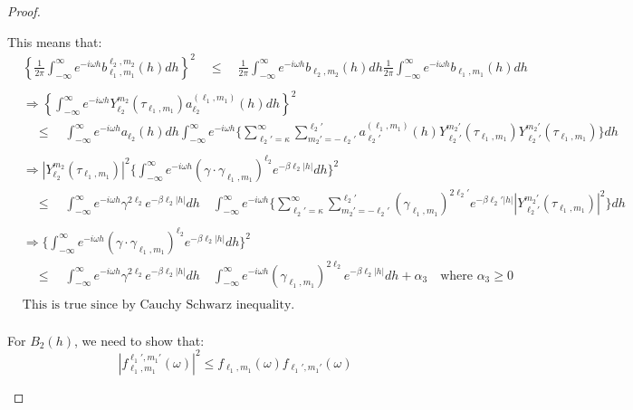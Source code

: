\documentclass[11pt]{article}
\begin{document}
\begin{itemize}
\begin{proof}
\begin{enumerate}
This means that:
\begin{align*}
&\left\{ \frac{1}{2\pi} \int_{-\infty}^\infty e^{-i\omega h} b_{\ell_1,m_1}^{\ell_2,m_2}(h) dh \right\}^2 \quad \le \quad \frac{1}{2\pi} \int_{-\infty}^\infty e^{-i\omega h} b_{\ell_2,m_2}(h) dh \frac{1}{2\pi} \int_{-\infty}^\infty e^{-i\omega h} b_{\ell_1,m_1}(h) dh \\
\\
&\Rightarrow \left\{ \int_{-\infty}^\infty e^{-i\omega h} Y_{\ell_2}^{m_2}(\tau_{\ell_1,m_1}) a_{\ell_2}^{(\ell_1,m_1)}(h) dh \right\}^2\\ 
&\quad \le \quad \int_{-\infty}^\infty e^{-i\omega h} a_{\ell_2}(h) dh \int_{-\infty}^\infty e^{-i\omega h} \biggl\{ \sum_{\ell_2'=\kappa}^{\infty} \sum_{m_2'=-\ell_2'}^{\ell_2'} a_{\ell_2'}^{(\ell_1,m_1)}(h) Y_{\ell_2'}^{m_2'}(\tau_{\ell_1,m_1}) Y_{\ell_2'}^{m_2'}(\tau_{\ell_1,m_1}) \biggl\} dh\\
\\
&\Rightarrow |Y_{\ell_2}^{m_2}(\tau_{\ell_1,m_1})|^2 \biggl\{\int_{-\infty}^\infty e^{-i\omega h} (\gamma \cdot \gamma_{\ell_1,m_1})^{\ell_2} e^{-\beta \ell_2 |h|} dh \biggl\}^2\\
& \quad \le \quad \int_{-\infty}^\infty e^{-i\omega h} \gamma^{2\ell_2} e^{-\beta \ell_2 |h|}dh \quad \int_{-\infty}^\infty e^{-i\omega h} \biggl\{ \sum_{\ell_2'=\kappa}^{\infty} \sum_{m_2'=-\ell_2'}^{\ell_2'} (\gamma_{\ell_1,m_1})^{2 \ell_2'} e^{-\beta \ell_2' |h|} |Y_{\ell_2'}^{m_2'}(\tau_{\ell_1,m_1})|^2\biggl\} dh\\
\\
&\Rightarrow \biggl\{\int_{-\infty}^\infty e^{-i\omega h} (\gamma \cdot \gamma_{\ell_1,m_1})^{\ell_2} e^{-\beta \ell_2 |h|} dh \biggl\}^2\\
& \quad \le \quad \int_{-\infty}^\infty e^{-i\omega h} \gamma^{2\ell_2} e^{-\beta \ell_2 |h|}dh \quad \int_{-\infty}^\infty e^{-i\omega h} (\gamma_{\ell_1,m_1})^{2 \ell_2} e^{-\beta \ell_2 |h|} dh + \alpha_3 \quad \text{where } \alpha_3 \ge 0\\\\
&\text{This is true since by Cauchy Schwarz inequality.}\\
\end{align*}

For $B_2(h)$, we need to show that:\\
$$|f_{\ell_1,m_1}^{\ell_1', m_1'}(\omega)|^2 \le f_{\ell_1,m_1}(\omega) f_{\ell_1',m_1'}(\omega)$$


\end{enumerate}
\end{proof}
\end{itemize}
\end{document}
